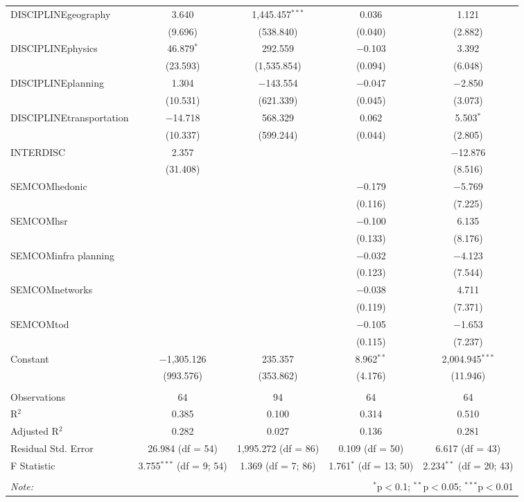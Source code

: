 \begin{table}[!htbp]
\begin{tabular}{@{\extracolsep{5pt}}lcccc}
  DISCIPLINEgeography & 3.640 & 1,445.457$^{***}$ & 0.036 & 1.121 \\ 
  & (9.696) & (538.840) & (0.040) & (2.882) \\ 
  DISCIPLINEphysics & 46.879$^{*}$ & 292.559 & $-$0.103 & 3.392 \\ 
  & (23.593) & (1,535.854) & (0.094) & (6.048) \\ 
  DISCIPLINEplanning & 1.304 & $-$143.554 & $-$0.047 & $-$2.850 \\ 
  & (10.531) & (621.339) & (0.045) & (3.073) \\ 
  DISCIPLINEtransportation & $-$14.718 & 568.329 & 0.062 & 5.503$^{*}$ \\ 
  & (10.337) & (599.244) & (0.044) & (2.805) \\ 
  INTERDISC & 2.357 &  &  & $-$12.876 \\ 
  & (31.408) &  &  & (8.516) \\ 
  SEMCOMhedonic &  &  & $-$0.179 & $-$5.769 \\ 
  &  &  & (0.116) & (7.225) \\ 
  SEMCOMhsr &  &  & $-$0.100 & 6.135 \\ 
  &  &  & (0.133) & (8.176) \\ 
  SEMCOMinfra planning &  &  & $-$0.032 & $-$4.123 \\ 
  &  &  & (0.123) & (7.544) \\ 
  SEMCOMnetworks &  &  & $-$0.038 & 4.711 \\ 
  &  &  & (0.119) & (7.371) \\ 
  SEMCOMtod &  &  & $-$0.105 & $-$1.653 \\ 
  &  &  & (0.115) & (7.237) \\ 
  Constant & $-$1,305.126 & 235.357 & 8.962$^{**}$ & 2,004.945$^{***}$ \\ 
  & (993.576) & (353.862) & (4.176) & (11.946) \\ 
 \hline \\[-1.8ex] 
Observations & 64 & 94 & 64 & 64 \\ 
R$^{2}$ & 0.385 & 0.100 & 0.314 & 0.510 \\ 
Adjusted R$^{2}$ & 0.282 & 0.027 & 0.136 & 0.281 \\ 
Residual Std. Error & 26.984 (df = 54) & 1,995.272 (df = 86) & 0.109 (df = 50) & 6.617 (df = 43) \\ 
F Statistic & 3.755$^{***}$ (df = 9; 54) & 1.369 (df = 7; 86) & 1.761$^{*}$ (df = 13; 50) & 2.234$^{**}$ (df = 20; 43) \\ 
\hline 
\hline \\[-1.8ex] 
\textit{Note:}  & \multicolumn{4}{r}{$^{*}$p$<$0.1; $^{**}$p$<$0.05; $^{***}$p$<$0.01} \\ 
\end{tabular} 
\end{table} 
